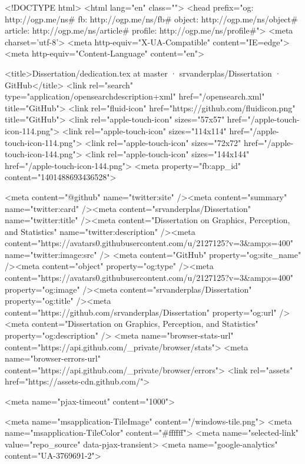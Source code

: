 


<!DOCTYPE html>
<html lang="en" class="">
  <head prefix="og: http://ogp.me/ns# fb: http://ogp.me/ns/fb# object: http://ogp.me/ns/object# article: http://ogp.me/ns/article# profile: http://ogp.me/ns/profile#">
    <meta charset='utf-8'>
    <meta http-equiv="X-UA-Compatible" content="IE=edge">
    <meta http-equiv="Content-Language" content="en">
    
    
    <title>Dissertation/dedication.tex at master · srvanderplas/Dissertation · GitHub</title>
    <link rel="search" type="application/opensearchdescription+xml" href="/opensearch.xml" title="GitHub">
    <link rel="fluid-icon" href="https://github.com/fluidicon.png" title="GitHub">
    <link rel="apple-touch-icon" sizes="57x57" href="/apple-touch-icon-114.png">
    <link rel="apple-touch-icon" sizes="114x114" href="/apple-touch-icon-114.png">
    <link rel="apple-touch-icon" sizes="72x72" href="/apple-touch-icon-144.png">
    <link rel="apple-touch-icon" sizes="144x144" href="/apple-touch-icon-144.png">
    <meta property="fb:app_id" content="1401488693436528">

      <meta content="@github" name="twitter:site" /><meta content="summary" name="twitter:card" /><meta content="srvanderplas/Dissertation" name="twitter:title" /><meta content="Dissertation on Graphics, Perception, and Statistics" name="twitter:description" /><meta content="https://avatars0.githubusercontent.com/u/2127125?v=3&amp;s=400" name="twitter:image:src" />
      <meta content="GitHub" property="og:site_name" /><meta content="object" property="og:type" /><meta content="https://avatars0.githubusercontent.com/u/2127125?v=3&amp;s=400" property="og:image" /><meta content="srvanderplas/Dissertation" property="og:title" /><meta content="https://github.com/srvanderplas/Dissertation" property="og:url" /><meta content="Dissertation on Graphics, Perception, and Statistics" property="og:description" />
      <meta name="browser-stats-url" content="https://api.github.com/_private/browser/stats">
    <meta name="browser-errors-url" content="https://api.github.com/_private/browser/errors">
    <link rel="assets" href="https://assets-cdn.github.com/">
    
    <meta name="pjax-timeout" content="1000">
    

    <meta name="msapplication-TileImage" content="/windows-tile.png">
    <meta name="msapplication-TileColor" content="#ffffff">
    <meta name="selected-link" value="repo_source" data-pjax-transient>
      <meta name="google-analytics" content="UA-3769691-2">

